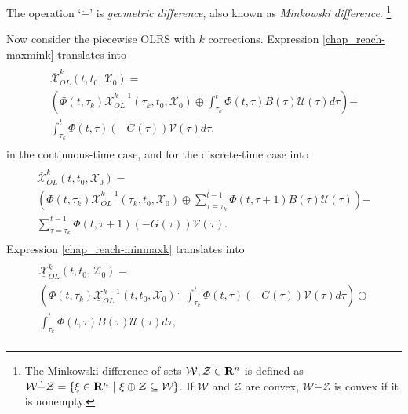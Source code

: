 \documentclass[letterpaper,10pt,english]{sphinxmanual}
\begin{document}
The operation ‘$\dot{-}$’ is \emph{geometric difference}, also known as
\emph{Minkowski difference}. \footnote{
The Minkowski difference of sets
${\mathcal W}, {\mathcal Z}\in{\bf R}^n$ is defined as
${\mathcal W}\dot{-}{\mathcal Z}= \left\{\xi\in{\bf R}^n ~|~
\xi \oplus {\mathcal Z}\subseteq {\mathcal W}\right\}$. If
${\mathcal W}$ and ${\mathcal Z}$ are convex,
${\mathcal W}\dot{-}{\mathcal Z}$ is convex if it is nonempty.
}

Now consider the piecewise OLRS with $k$ corrections. Expression
\eqref{chap_reach-maxmink} translates into
\label{chap_reach:equation-ctlsmaxmink}\begin{gather}
\begin{split}\begin{array}{l}
\overline{{\mathcal X}}_{OL}^k(t, t_0, {\mathcal X}_0) = \\
\left(\Phi(t, \tau_k)\overline{{\mathcal X}}_{OL}^{k-1}(\tau_k, t_0, {\mathcal X}_0) \oplus
\int_{\tau_k}^t\Phi(t, \tau)B(\tau){\mathcal U}(\tau)d\tau\right) \dot{-} \\
\int_{\tau_k}^t\Phi(t, \tau)(-G(\tau)){\mathcal V}(\tau)d\tau,
\end{array}\end{split}\label{chap_reach-ctlsmaxmink}
\end{gather}
in the continuous-time case, and for the discrete-time case into
\label{chap_reach:equation-dtlsmaxmink}\begin{gather}
\begin{split}\begin{array}{l}
\overline{{\mathcal X}}_{OL}^k(t, t_0, {\mathcal X}_0) = \\
\left(\Phi(t, \tau_k)\overline{{\mathcal X}}_{OL}^{k-1}(\tau_k, t_0, {\mathcal X}_0) \oplus
\sum_{\tau=\tau_k}^{t-1}\Phi(t, \tau+1)B(\tau){\mathcal U}(\tau)\right) \dot{-} \\
\sum_{\tau=\tau_k}^{t-1}\Phi(t, \tau+1)(-G(\tau)){\mathcal V}(\tau).
\end{array}\end{split}\label{chap_reach-dtlsmaxmink}
\end{gather}
Expression \eqref{chap_reach-minmaxk} translates into
\label{chap_reach:equation-ctlsminmaxk}\begin{gather}
\begin{split}\begin{array}{l}
\underline{{\mathcal X}}_{OL}^k(t, t_0, {\mathcal X}_0) = \\
\left(\Phi(t, \tau_k)\underline{{\mathcal X}}_{OL}^{k-1}(t, t_0, {\mathcal X}_0) \dot{-}
\int_{\tau_k}^t\Phi(t, \tau)(-G(\tau)){\mathcal V}(\tau)d\tau\right)
\oplus \\
\int_{\tau_k}^t\Phi(t, \tau)B(\tau){\mathcal U}(\tau)d\tau,
\end{array}\end{split}\label{chap_reach-ctlsminmaxk}
\end{gather}
\end{document}

